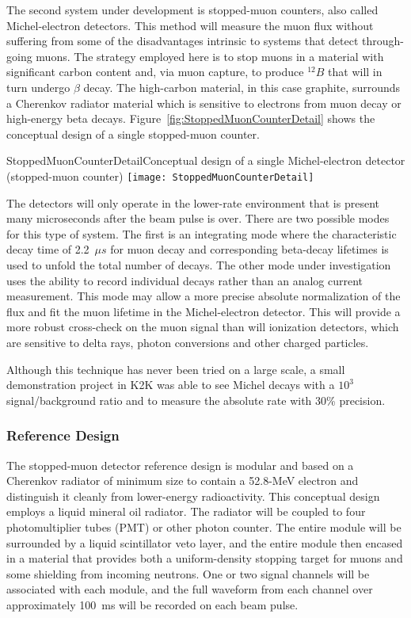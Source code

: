 The second system under development is stopped-muon counters, also called
Michel-electron detectors. This method will measure the muon flux without
suffering from some of the disadvantages intrinsic to systems that
detect through-going muons. The strategy employed here is to stop muons
in a material with significant carbon content 
and, via muon capture, to produce $^{12}B$ that will in turn undergo $\beta$ decay.
 The high-carbon material, in this case graphite, surrounds a Cherenkov radiator
material which is sensitive to electrons from muon decay or 
high-energy beta decays.  Figure~\ref{fig:StoppedMuonCounterDetail} 
shows the conceptual design of a single stopped-muon counter. 


\begin{cdrfigure}{StoppedMuonCounterDetail}{Conceptual design of a single Michel-electron detector (stopped-muon counter)}
\texttt{[image: StoppedMuonCounterDetail]}
\end{cdrfigure}

The detectors will only operate in the lower-rate
environment that is present many microseconds after the beam pulse is
over. There are two possible modes for this type of system. 
The first is an integrating mode where the characteristic decay time of 
2.2~$\mu s$ for muon decay and corresponding beta-decay lifetimes is used to
unfold the total number of decays. The other mode under
investigation uses the ability to record individual decays rather
than an analog current measurement. This mode may allow a more precise absolute
normalization of the flux and fit the muon lifetime in the Michel-electron detector. 
This will provide a more robust cross-check on the
muon signal than will ionization detectors, which are sensitive to delta
rays, photon conversions and other charged particles.

Although this technique has never been tried on a large scale, a small
demonstration project in K2K was able to see Michel decays with a
$10^{3}$ signal/background ratio and to measure the absolute rate with
30\% precision\cite{ref:K2KMuDecayMon}.

\subsubsection{Reference Design}

The stopped-muon detector reference design
is modular and based on a Cherenkov radiator of
minimum size to contain a 52.8-MeV electron and distinguish it cleanly
from lower-energy radioactivity. This conceptual design employs
a liquid mineral oil  radiator. The radiator will be coupled to four photomultiplier tubes (PMT) or
other photon counter.  The entire module will be surrounded by a 
liquid scintillator veto layer, and the entire module then
encased in a material that provides both a uniform-density stopping
target for muons and some shielding from incoming neutrons. One or two
signal channels will be associated with each module, and the full
waveform from each channel over approximately 100~ms will be recorded
on each beam pulse.


